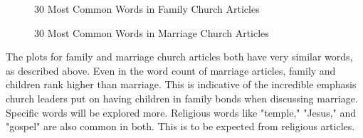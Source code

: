 \documentclass[twocolumn]{article}
\begin{document}
\begin{figure}[h]
    \centering
    \caption{30 Most Common Words in Family Church Articles}
    \label{fig:fcwc}
\end{figure}



\begin{figure}[h]
    \centering
    \caption{30 Most Common Words in Marriage Church Articles}
    \label{fig:mcwc}
\end{figure}

The plots for family and marriage church articles both have very similar words, as described above. Even in the word count of marriage articles, family and children rank higher than marriage. This is indicative of the incredible emphasis church leaders put on having children in family bonds when discussing marriage. Specific words will be explored more. Religious words like "temple," "Jesus," and "gospel" are also common in both. This is to be expected from religious articles.%
\end{document}
